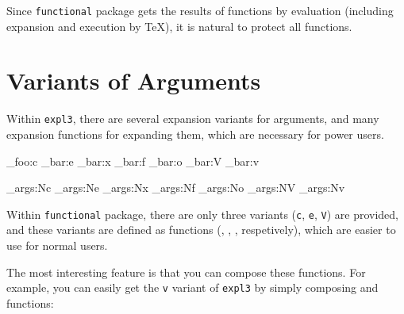 \documentclass[oneside]{book}
\begin{document}
Since \verb!functional! package gets the results of functions by evaluation
(including expansion and execution by \TeX), it is natural to protect all functions.

\section{Variants of Arguments}

Within \verb!expl3!, there are several expansion variants for arguments,
and many expansion functions for expanding them, which are necessary for power users.

\begin{minipage}{0.5\textwidth}
\begin{code}[language=latex/latex3]
\module_foo:c
\module_bar:e
\module_bar:x
\module_bar:f
\module_bar:o
\module_bar:V
\module_bar:v
\end{code}
\end{minipage}%
\begin{minipage}{0.5\textwidth}
\begin{code}[language=latex/latex3]
\exp_args:Nc
\exp_args:Ne
\exp_args:Nx
\exp_args:Nf
\exp_args:No
\exp_args:NV
\exp_args:Nv
\end{code}
\end{minipage}

Within \verb!functional! package, there are only three variants
(\verb!c!, \verb!e!, \verb!V!) are provided, and these variants are defined
as functions (, , , respetively),
which are easier to use for normal users.

\begin{demohigh}
\newcommand\test{uvw}
\end{demohigh}

\begin{demohigh}
\newcommand\test{uvw}
\Expand{111\test222}
\end{demohigh}

\begin{demohigh}
\IntSet{}
\Value\lTmpaInt
\end{demohigh}

The most interesting feature is that you can compose these functions.
For example, you can easily get the \verb!v! variant of \verb!expl3! by
simply composing  and  functions:

\begin{demohigh}
\IntSet{}
\end{demohigh}
\end{document}
